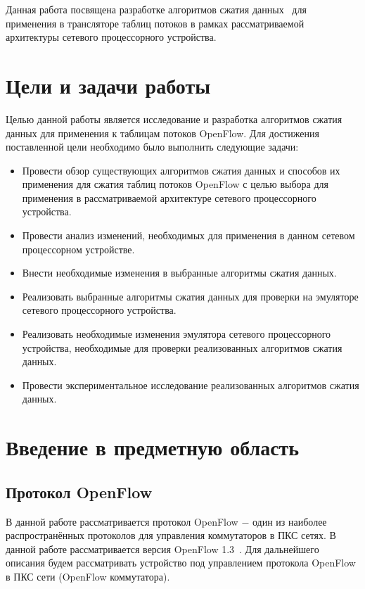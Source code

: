 \documentclass[oneside,final,12pt]{extarticle}
\begin{document}
        Данная работа посвящена разработке алгоритмов сжатия данных~\cite{retvari2013compressing}
        для применения в трансляторе таблиц потоков в рамках рассматриваемой архитектуры 
        сетевого процессорного устройства.

    \section{Цели и задачи работы}
        Целью данной работы является исследование и разработка алгоритмов сжатия данных для применения к таблицам потоков OpenFlow. Для достижения поставленной цели
        необходимо было выполнить следующие задачи:
        \begin{itemize}
            \item Провести обзор существующих алгоритмов сжатия данных и способов их применения для сжатия таблиц потоков OpenFlow с целью выбора 
                для применения в рассматриваемой архитектуре сетевого процессорного устройства.
            \item Провести анализ изменений, необходимых для применения в данном сетевом процессорном устройстве.
            \item Внести необходимые изменения в выбранные алгоритмы сжатия данных.
            \item Реализовать выбранные алгоритмы сжатия данных для проверки на эмуляторе сетевого процессорного устройства.
            \item Реализовать необходимые изменения эмулятора сетевого процессорного устройства, необходимые для проверки реализованных алгоритмов
                сжатия данных.
            \item Провести экспериментальное исследование реализованных алгоритмов сжатия данных.
        \end{itemize}
    \section{Введение в предметную область}
        \subsection{Протокол OpenFlow}
            \label{sect:openflow}
            В данной работе рассматривается протокол OpenFlow $-$ один из наиболее распространённых протоколов для управления коммутаторов в ПКС сетях.
            В данной работе рассматривается версия OpenFlow 1.3~\cite{openflow}. Для дальнейшего описания будем рассматривать устройство под управлением протокола OpenFlow в ПКС сети (OpenFlow коммутатора).
\end{document}
